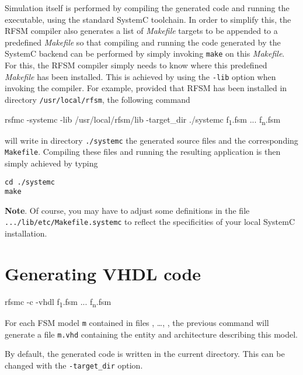 \medskip
Simulation itself is performed by compiling the generated code and running the executable,
using the standard SystemC toolchain.
In order to simplify this, the RFSM compiler also generates a list of \emph{Makefile} targets to be
appended to a predefined \emph{Makefile} so that compiling and running the code generated by the
SystemC backend can be performed by simply invoking \verb|make| on this \emph{Makefile}. For this,
the RFSM compiler simply needs to know where this predefined \emph{Makefile} has been
installed. This is achieved by using the \verb|-lib| option when invoking the compiler. For example,
provided that RFSM has been installed in directory \verb|/usr/local/rfsm|, the following command

\begin{FVerbatim}[commandchars=\\\{\}]
rsfmc -systemc -lib /usr/local/rfsm/lib -target_dir ./systemc f\textsubscript{1}.fsm ... f\textsubscript{n}.fsm
\end{FVerbatim}

will write in directory \verb|./systemc| the generated source files and the corresponding
\verb|Makefile|. Compiling these files and running the resulting application is then simply achieved
by typing

\begin{verbatim}
cd ./systemc
make 
\end{verbatim}

\medskip
\textbf{Note}. Of course, you may have to adjust some definitions in the file
\verb|.../lib/etc/Makefile.systemc| to reflect the specificities of your local SystemC installation. 

\section{Generating VHDL code}
\label{sec:generating-vhdl-code}

\begin{FVerbatim}[commandchars=\\\{\}]
rfsmc -c -vhdl f\textsubscript{1}.fsm ... f\textsubscript{n}.fsm
\end{FVerbatim}

For each FSM model \texttt{m} contained in files , \ldots, , the
previous command will generate a file \verb|m.vhd| containing the entity and architecture describing
this model.

By default, the generated code is written in the current directory. This can be changed with the
\verb|-target_dir| option.

